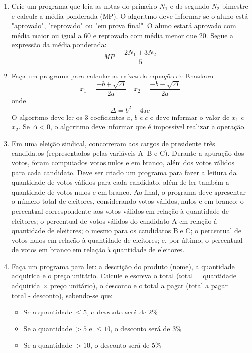 \documentclass[12pt]{article}
\begin{document}
	\begin{enumerate}
	\item Crie um programa que leia as notas do primeiro \(N_{1}\) e do segundo \(N_{2}\) bimestre e calcule a média ponderada (MP). O algoritmo deve informar se o aluno está "aprovado", "reprovado" ou "em prova final". O aluno estará aprovado com média maior ou igual a 60 e reprovado com média menor que 20. Segue a expressão da média ponderada:
	\[ MP = \frac{2N_{1} + 3N_{2}}{5} \]
	
	\item  Faça um programa para calcular as raízes da equação de Bhaskara. 
	\[ x_{1} = \frac{-b + \sqrt{\Delta}}{2a} \quad x_{2} = \frac{-b - \sqrt{\Delta}}{2a} \]
	onde
	\[ \Delta = b^{2} - 4ac \]
	O algoritmo deve ler os 3 coeficientes \(a\), \(b\) e \(c\) e deve informar o valor de \(x_{1}\) e \(x_{2}\). Se \(\Delta < 0\), o algoritmo deve informar que é impossível realizar a operação.
	
	\item Em uma eleição sindical, concorreram aos cargos de presidente três candidatos (representados pelas variáveis A, B e C). Durante a apuração dos votos, foram computados votos nulos e em branco, além dos votos válidos para cada candidato. Deve ser criado um programa para fazer a leitura da quantidade de votos válidos para cada candidato, além de ler também a quantidade de votos nulos e em branco. Ao final, o programa deve apresentar o número total de eleitores, considerando votos válidos, nulos e em branco; o percentual correspondente aos votos válidos em relação à quantidade de eleitores; o percentual de votos válidos do candidato A em relação à quantidade de eleitores; o mesmo para os candidatos B e C; o percentual de votos nulos em relação à quantidade de eleitores; e, por último, o percentual de votos em branco em relação à quantidade de eleitores.
	
	\item Faça um programa para ler: a descrição do produto (nome), a quantidade adquirida e o preço unitário. Calcule e escreva o total (total = quantidade adquirida \(\times\) preço unitário), o desconto e o total a pagar (total a pagar = total - desconto), sabendo-se que:
	\begin{itemize}
		\item Se a quantidade \(\leq 5\), o desconto será de 2\%
		\item Se a quantidade \(> 5\) e \(\leq 10\), o desconto será de 3\%
		\item Se a quantidade \(> 10\), o desconto será de 5\%
	\end{itemize}
	

\end{enumerate}
\end{document}
